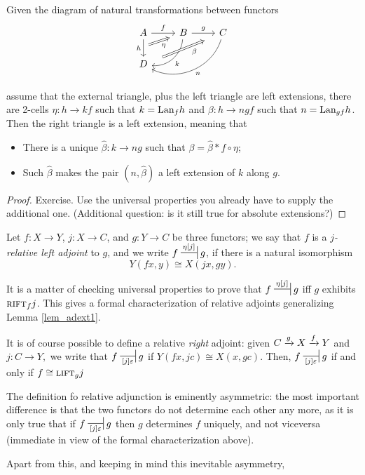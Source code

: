 \begin{lemma}\label{lem_adext2} Given the
diagram of natural transformations between functors
\[
\begin{tikzcd} A \ar[r,"f"] \ar[d, "h"'{name=h}] & B \ar[from=h,Rightarrow,
shorten <=2mm, shorten >=2mm, "\eta"']\ar[dl,"k", bend left=45]\ar[r, "g"] & C
\ar[dll,"n",bend left=50]\\ D \ar[Rightarrow, urr,shorten <=4mm, shorten >=4mm,
"\beta"', pos=.6]&&
\end{tikzcd}
\] assume that the external triangle, plus the left triangle are left
extensions, \ie there are 2-cells $\eta : h \to kf$ such that $k=\text{Lan}_fh$ and
$\beta : h \to ngf$ such that $n=\text{Lan}_{gf}h$. Then the right triangle is a left
extension, meaning that
\begin{itemize}
	\item There is a unique $\hat \beta : k \to ng$ such that $\beta = \hat \beta
* f \circ \eta$;
	\item Such $\hat\beta$ makes the pair $(n,\hat\beta)$ a left extension of $k$
along $g$.
\end{itemize}
\end{lemma}
\begin{proof} Exercise. Use the universal properties you already have to supply
the additional one. (Additional question: is it still true for absolute extensions?)
\end{proof}
\begin{definition} Let $f : X \to Y $, $j : X \to C$, and
$g : Y \to C$ be three functors; we say that $f$ is a \emph{$j$-relative left
adjoint} to $g$, and we write $f\adjunct{\eta[j]}{} g$, if there is a natural
isomorphism
\[ Y(fx,y) \cong X(jx,gy).
\]
\end{definition}
\begin{remark} It is a matter of checking universal properties to prove that
$f\adjunct{\eta[j]}{}g$ iff $g$ exhibits $\textsc{rift}_fj$. This gives a formal
characterization of relative adjoints generalizing Lemma \ref{lem_adext1}.
\end{remark} It is of course possible to define a relative \emph{right} adjoint:
given $C \xrightarrow{g}X \xrightarrow{f}Y$ and $j : C \to Y, $ we write that
$f\adjunct{}{[j]\varepsilon} g$ if $Y(fx,jc)\cong X(x,gc)$. Then, $f
\adjunct{}{[j]\varepsilon} g$ if and only if $f\cong \textsc{lift}_gj$
\begin{remark} The definition fo relative adjunction is eminently asymmetric:
the most important difference is that the two functors do not determine each
other any more, as it is only true that if $f\adjunct{}{[j]\varepsilon} g$ then
$g$ determines $f$ uniquely, and not viceversa (immediate in view of the formal
characterization above).
\end{remark} Apart from this, and keeping in mind this inevitable asymmetry,
